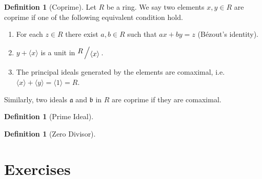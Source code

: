\documentclass{book}
\theoremstyle{plain}
\theoremstyle{definition}
\theoremstyle{custom_definition}
\newtheorem{defn}[thm]{Definition}
\newcommand{\bigslant}[2]{{\raisebox{.2em}{$#1$}\left/\raisebox{-.2em}{$#2$}\right.}}
\begin{document}
\begin{defn}[Coprime]
  Let \(R\) be a ring. We say two elements \(x, y \in R\) are coprime if one of the following equivalent condition hold.
  \begin{enumerate}
    \item For each \(z \in R\) there exist \(a, b \in R\) such that \(ax + by = z\) (Bézout's identity).
    \item \(y + \langle x \rangle\) is a unit in \(\bigslant{R}{\langle x \rangle}\).
    \item The principal ideals generated by the elements are comaximal, i.e. \(\langle x \rangle + \langle y \rangle = \langle 1 \rangle = R\).
  \end{enumerate}
  Similarly, two ideals \(\mathfrak{a}\) and \(\mathfrak{b}\) in \(R\) are coprime if they are comaximal.
\end{defn}

\begin{defn}[Prime Ideal]
\end{defn}

\begin{defn}[Zero Divisor]
\end{defn}

\part{Exercises}
\end{document}
